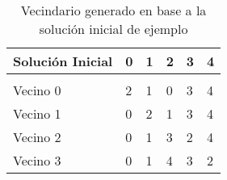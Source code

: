 \begin{table}[h!]
\centering
\begin{tabular}{llllll}
\hline
\multicolumn{1}{|l|}{Solución Inicial} & \multicolumn{1}{l|}{0} & \multicolumn{1}{l|}{1} & \multicolumn{1}{l|}{\cellcolor[HTML]{9AFF99}2} & \multicolumn{1}{l|}{3} & \multicolumn{1}{l|}{4} \\ \hline
 &  &  &  &  &  \\ \hline
\multicolumn{1}{|l|}{Vecino 0} & \multicolumn{1}{l|}{\cellcolor[HTML]{9AFF99}2} & \multicolumn{1}{l|}{1} & \multicolumn{1}{l|}{\cellcolor[HTML]{FFCCC9}0} & \multicolumn{1}{l|}{3} & \multicolumn{1}{l|}{4} \\ \hline
\multicolumn{1}{|l|}{Vecino 1} & \multicolumn{1}{l|}{0} & \multicolumn{1}{l|}{\cellcolor[HTML]{9AFF99}2} & \multicolumn{1}{l|}{\cellcolor[HTML]{FFCCC9}1} & \multicolumn{1}{l|}{3} & \multicolumn{1}{l|}{4} \\ \hline
\multicolumn{1}{|l|}{Vecino 2} & \multicolumn{1}{l|}{0} & \multicolumn{1}{l|}{1} & \multicolumn{1}{l|}{\cellcolor[HTML]{FFCCC9}3} & \multicolumn{1}{l|}{\cellcolor[HTML]{9AFF99}2} & \multicolumn{1}{l|}{4} \\ \hline
\multicolumn{1}{|l|}{Vecino 3} & \multicolumn{1}{l|}{0} & \multicolumn{1}{l|}{1} & \multicolumn{1}{l|}{\cellcolor[HTML]{FFCCC9}4} & \multicolumn{1}{l|}{3} & \multicolumn{1}{l|}{\cellcolor[HTML]{9AFF99}2} \\ \hline
\end{tabular}
\caption{Vecindario generado en base a la solución inicial de ejemplo}
\label{fig:gen_vecindario}
\end{table}


